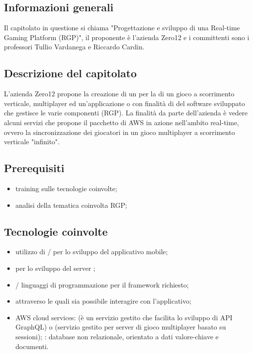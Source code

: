 \subsection{Informazioni generali}
Il capitolato in questione si chiama "Progettazione e sviluppo di una {Real-time Gaming Platform (RGP)}", il proponente è l'azienda Zero12 e i committenti sono i professori Tullio Vardanega e Riccardo Cardin.

\subsection{Descrizione del capitolato}
L’azienda Zero12 propone la creazione di un  per la  di un gioco a scorrimento verticale, multiplayer ed un'applicazione  o  con finalità di  del software sviluppato che gestisce le varie componenti (RGP).
La finalità da parte dell’azienda è vedere alcuni servizi che propone il pacchetto di AWS in azione nell’ambito real-time, ovvero la sincronizzazione dei giocatori in un gioco multiplayer a scorrimento verticale "infinito".
\subsection{Prerequisiti}
\begin{itemize}
\item training sulle tecnologie coinvolte;
\item analisi della tematica coinvolta RGP; 
\end{itemize}
\subsection{Tecnologie coinvolte}
\begin{itemize}
\item utilizzo di / per lo sviluppo del applicativo mobile;
\item {} per lo sviluppo del server ;
\item {}/ linguaggi di programmazione per il framework  richiesto;
\item {}  attraverso le quali sia possibile interagire con l'applicativo;
\item AWS cloud services: 
(è un servizio gestito che facilita lo sviluppo di API GraphQL) o (servizio gestito per server di gioco multiplayer basato su sessioni);
: database non relazionale, orientato a dati valore-chiave e documenti.
\end{itemize}

